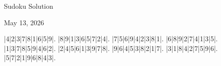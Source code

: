 \documentclass{article}
\begin{document}
\begin{center}
\Huge{Sudoku Solution}
\end{center}
\begin{center}
\Large{May 13, 2026}
\end{center}
\begin{sudoku}
|4|2|3|7|8|1|6|5|9|.
|8|9|1|3|6|5|7|2|4|.
|7|5|6|9|4|2|3|8|1|.
|6|8|9|2|7|4|1|3|5|.
|1|3|7|8|5|9|4|6|2|.
|2|4|5|6|1|3|9|7|8|.
|9|6|4|5|3|8|2|1|7|.
|3|1|8|4|2|7|5|9|6|.
|5|7|2|1|9|6|8|4|3|.
\end{sudoku}
\end{document}
